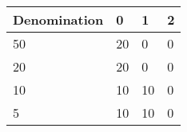 \begin{tabular}{llll}
    Denomination & 0  & 1  & 2 \\
    \hline
    50           & 20 & 0  & 0 \\
    20           & 20 & 0  & 0 \\
    10           & 10 & 10 & 0 \\
    5            & 10 & 10 & 0 \\
    \hline
\end{tabular}